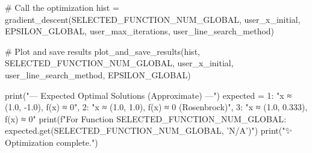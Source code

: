 \documentclass[12pt]{article} %
\begin{document}
\begin{python}
    # Call the optimization
    hist = gradient_descent(SELECTED_FUNCTION_NUM_GLOBAL, user_x_initial, EPSILON_GLOBAL, 
                              user_max_iterations, user_line_search_method)
    
    # Plot and save results
    plot_and_save_results(hist, SELECTED_FUNCTION_NUM_GLOBAL, user_x_initial, 
                          user_line_search_method, EPSILON_GLOBAL)

    print("\n--- Expected Optimal Solutions (Approximate) ---")
    expected = {
        1: "x ≈ (1.0, -1.0), f(x) ≈ 0",
        2: "x ≈ (1.0, 1.0), f(x) ≈ 0 (Rosenbrock)",
        3: "x ≈ (1.0, 0.333), f(x) ≈ 0"
    }
    print(f"For Function {SELECTED_FUNCTION_NUM_GLOBAL}: {expected.get(SELECTED_FUNCTION_NUM_GLOBAL, 'N/A')}")
    print("\n✨ Optimization complete.")
\end{python}
\end{document}
